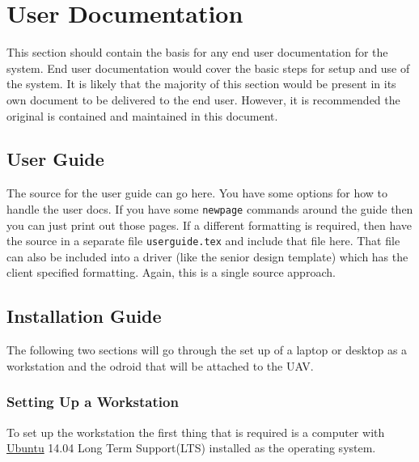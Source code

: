 
\chapter{User Documentation}

This section should contain the basis for any end user documentation for the system. 
 End user documentation would cover the basic steps for setup and use of the system. 
 It is likely that the majority of this section would be present in its own document 
to be delivered to the end user.  However, it is recommended the original is contained 
and maintained in this document. 


\section{User Guide}

The source for the user guide can go here.    You have some options for how to handle the user docs.  If you have some {\tt newpage} commands around the guide then you can just print out those pages.   If a different formatting is required, then have the source in a separate file {\tt userguide.tex} and include that file here.  That file can also be included into a driver (like the senior design template) which has the client specified formatting.  Again, this is a single source approach.   


\section{Installation Guide}
The following two sections will go through the set up of a laptop or desktop as a workstation and the odroid that will be attached to the UAV.
\subsection{Setting Up a Workstation}
To set up the workstation the first thing that is required is a computer with \href{http://www.ubuntu.com/download/desktop}{Ubuntu} 14.04 Long Term Support(LTS) installed as the operating system. 
